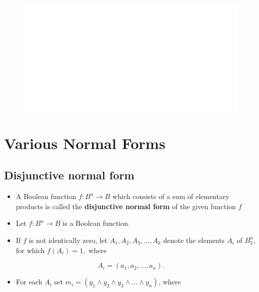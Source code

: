 \documentclass[]{book}
\providecommand{\tightlist}{%
  \setlength{\itemsep}{0pt}\setlength{\parskip}{0pt}}
\begin{document}
\begin{figure}

{\centering \includegraphics[width=1\linewidth]{figure/boxC415-1} 

}

\end{figure}

\hypertarget{various-normal-forms}{%
\section{Various Normal Forms}\label{various-normal-forms}}

\hypertarget{disjunctive-normal-form}{%
\subsection{Disjunctive normal form}\label{disjunctive-normal-form}}

\begin{itemize}
\tightlist
\item
  A Boolean function \(f: B^n \rightarrow B\) which consists of a sum of elementary products is called the \textbf{disjunctive normal form} of the given function \(f\)
\item
  Let \(f: B^n \rightarrow B\) is a Boolean function.
\item
  If \(f\) is not identically zero, let \(A_1, A_2, A_3, \dots, A_k\) denote the elements \(A_i\) of \(B_2^n,\) for which \(f(A_i) =1,\) where
\end{itemize}

\[A_i = (a_1, a_2,\dots, a_n).\]

\begin{itemize}
\tightlist
\item
  For each \(A_i\) set \(m_i = (y_1 \land y_2 \land y_3\land \dots \land y_n)\), where
\end{itemize}
\end{document}

